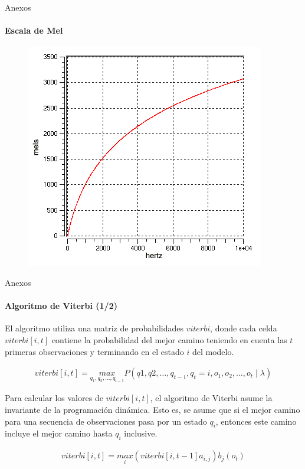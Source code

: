 \begin{frame}{Anexos}
\framesubtitle{Escala de Mel}
\begin{figure}[H]
\centering
\includegraphics[width=0.7\linewidth]{./graphics/mel_hz.png}
\end{figure}
\end{frame}

\begin{frame}{Anexos}
\framesubtitle{Algoritmo de Viterbi (1/2)}
El algoritmo utiliza una matriz de probabilidades $viterbi$, donde cada celda $viterbi[i,t]$ 
contiene la probabilidad del mejor camino teniendo en cuenta las $t$ primeras observaciones y 
terminando en el estado $i$ del modelo.

\begin{align*}
    viterbi[i,t] = \displaystyle \underset{q_1,q_2,\ldots,q_{t - 1}}{max} P(q1,q2,\ldots,q_{t - 1},
        q_t = i,o_1,o_2,\ldots,o_t \mid \lambda)    
\end{align*} 

Para calcular los valores de $viterbi[i,t]$, el algoritmo de Viterbi asume la invariante de la 
programaci\'on din\'amica. Esto es, se asume que si el mejor camino para una secuencia de observaciones 
pasa por un estado $q_i$, entonces este camino incluye el mejor camino hasta $q_i$ inclusive. 


\begin{align*}
    viterbi[i,t] = \displaystyle \underset{i}{max} (viterbi[i,t-1]a_{i,j})b_j(o_t)
\end{align*}

\end{frame}

